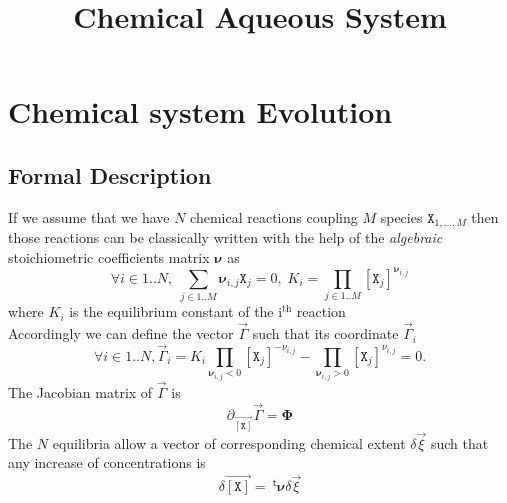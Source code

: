 \documentclass[aps,twocolumn]{revtex4}
\newcommand{\myconc}[1]{\left\lbrack #1 \right\rbrack}
\newcommand{\mychem}[1]{{\mathtt{#1}}}
\newcommand{\species}{\mychem{X}}
\newcommand{\mymat}[1]{\boldsymbol{#1}}
\newcommand{\mytrn}[1]{{\!\!~^{\mathsf{t}}{#1}}}
\newcommand{\myvec}[1]{\overrightarrow{#1}}
\newcommand{\vecX}{\myvec{\myconc{\mychem{X}}}}
\begin{document}
\title{Chemical Aqueous System}

\maketitle

\section{Chemical system Evolution}
\subsection{Formal Description}
If we assume that we have $N$ chemical reactions coupling $M$ species $\species_{1,\ldots,M}$ then those reactions can be classically written with the help
of the \textit{algebraic} stoichiometric coefficients matrix $\mymat{\nu}$ as
\begin{equation}
	\label{eq:Ki}
	\forall i \in 1..N, \; \sum_{j\in1..M} \mymat{\nu}_{i,j} \species_j = 0, \; K_i=\prod_{j\in1..M} \myconc{\species_j}^{\mymat{\nu}_{i,j}}
\end{equation}
where $K_i$ is the equilibrium constant of the i$^{\text{th}}$ reaction\\
Accordingly we can define the vector $\vec{\Gamma}$ such that its coordinate $\vec{\Gamma}_i$
\begin{equation}
	\label{eq:Gamma}
	\forall i \in 1..N, \vec{\Gamma}_i = K_i \prod_{\mymat{\nu}_{i,j}<0} \myconc{\species_j}^{-\nu_{i,j}} - \prod_{\mymat{\nu}_{i,j}>0} \myconc{\species_j}^{\nu_{i,j}} = 0.
\end{equation}
The Jacobian matrix of $\vec{\Gamma}$ is
\begin{equation}
	\partial_{\vecX} \vec{\Gamma} = \mymat{\Phi}
\end{equation}
The $N$ equilibria allow a vector of corresponding chemical extent $\delta\vec{\xi}$ such that any increase of concentrations is
\begin{equation}
	\delta\vecX = \mytrn{\mymat{\nu}} \delta\vec{\xi}
\end{equation}
\end{document}
